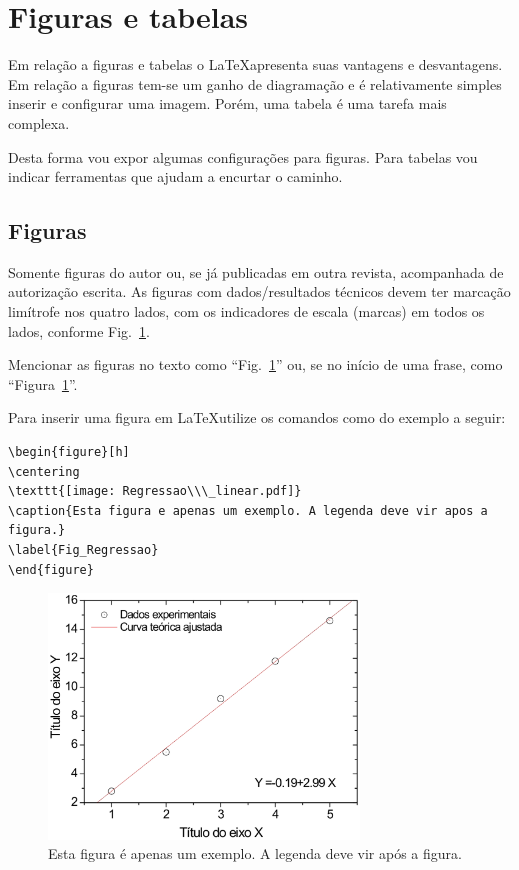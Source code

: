 \documentclass{RBClatex}
\begin{document}
\section{Figuras e tabelas}

Em relação a figuras e tabelas o \LaTeX apresenta suas vantagens e desvantagens. Em relação a figuras tem-se um ganho de diagramação e é relativamente simples inserir e configurar uma imagem. Porém, uma tabela é uma tarefa mais complexa. 

Desta forma vou expor algumas configurações para figuras. Para tabelas vou indicar ferramentas que ajudam a encurtar o caminho.

\subsection{Figuras}

Somente figuras do autor ou, se já publicadas em outra revista, acompanhada de autorização escrita. As figuras com dados/resultados técnicos devem ter marcação limítrofe nos quatro lados, com os indicadores de escala (marcas) em todos os lados, conforme Fig.~\ref{Fig_Regressao}.

Mencionar as figuras no texto como ``Fig.~\ref{Fig_Regressao}'' ou, se no início de uma frase, como “Figura~\ref{Fig_Regressao}”.

Para inserir uma figura em \LaTeX utilize os comandos como do exemplo a seguir:
\begin{lstlisting}
\begin{figure}[h]
\centering
\texttt{[image: Regressao\\\_linear.pdf]}
\caption{Esta figura e apenas um exemplo. A legenda deve vir apos a figura.}
\label{Fig_Regressao}
\end{figure}
\end{lstlisting}

\begin{figure}[h]
	\centering
	\includegraphics[keepaspectratio, width = 8.25cm]{Regressao_linear.eps}
	\caption{Esta figura é apenas um exemplo. A legenda deve vir após a figura.}
	\label{Fig_Regressao}
\end{figure}
\end{document}
